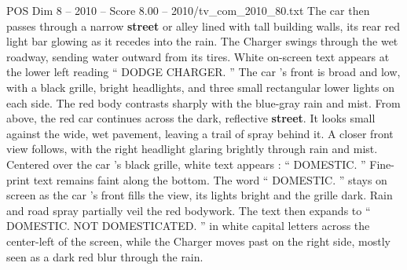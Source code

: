 \begin{textsample}{POS Dim 8 – 2010 – Score 8.00 – 2010/tv\_com\_2010\_80.txt}
The car then passes through a narrow \textbf{street} or alley lined with tall building walls, its rear red light bar glowing as it recedes into the rain.
The Charger swings through the wet roadway, sending water outward from its tires.
White on-screen text appears at the lower left reading “ DODGE CHARGER. ” The car ’s front is broad and low, with a black grille, bright headlights, and three small rectangular lower lights on each side.
The red body contrasts sharply with the blue-gray rain and mist.
From above, the red car continues across the dark, reflective \textbf{street}.
It looks small against the wide, wet pavement, leaving a trail of spray behind it.
A closer front view follows, with the right headlight glaring brightly through rain and mist.
Centered over the car ’s black grille, white text appears : “ DOMESTIC. ” Fine-print text remains faint along the bottom.
The word “ DOMESTIC. ” stays on screen as the car ’s front fills the view, its lights bright and the grille dark.
Rain and road spray partially veil the red bodywork.
The text then expands to “ DOMESTIC.
NOT DOMESTICATED. ” in white capital letters across the center-left of the screen, while the Charger moves past on the right side, mostly seen as a dark red blur through the rain.

\end{textsample}
